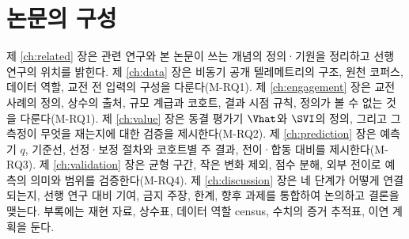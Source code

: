 \section{논문의 구성}
\label{sec:intro-outline}

제 \ref{ch:related} 장은 관련 연구와 본 논문이 쓰는 개념의 정의·기원을 정리하고 선행 연구의 위치를 밝힌다. 제 \ref{ch:data} 장은 비동기 공개 텔레메트리의 구조, 원천 코퍼스, 데이터 역할, 교전 전 입력의 구성을 다룬다(M-RQ1). 제 \ref{ch:engagement} 장은 교전 사례의 정의, 상수의 출처, 규모 계급과 코호트, 결과 시점 규칙, 정의가 볼 수 없는 것을 다룬다(M-RQ1). 제 \ref{ch:value} 장은 동결 평가기 $\Vhat$와 $\SVI$의 정의, 그리고 그 측정이 무엇을 재는지에 대한 검증을 제시한다(M-RQ2). 제 \ref{ch:prediction} 장은 예측기 $q$, 기준선, 선정·보정 절차와 코호트별 주 결과, 전이·합동 대비를 제시한다(M-RQ3). 제 \ref{ch:validation} 장은 균형 구간, 작은 변화 제외, 점수 분해, 외부 전이로 예측의 의미와 범위를 검증한다(M-RQ4). 제 \ref{ch:discussion} 장은 네 단계가 어떻게 연결되는지, 선행 연구 대비 기여, 금지 주장, 한계, 향후 과제를 통합하여 논의하고 결론을 맺는다. 부록에는 재현 자료, 상수표, 데이터 역할 census, 수치의 증거 추적표, 이연 계획을 둔다.
